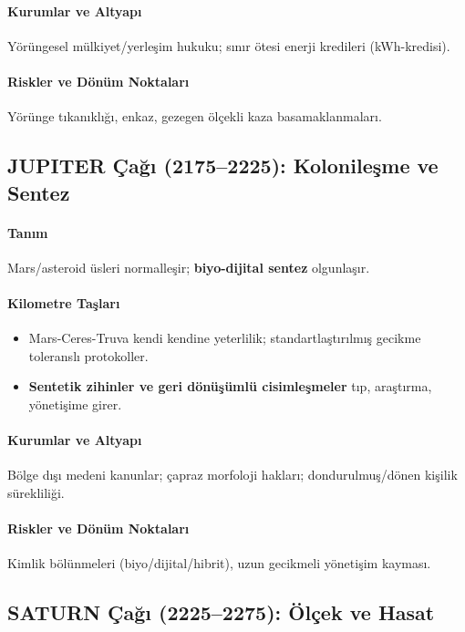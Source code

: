 \documentclass[11pt]{article}
\begin{document}
\begin{itemize}[noitemsep]
\begin{itemize}[noitemsep]
\begin{itemize}[noitemsep]
\begin{itemize}[noitemsep]
\begin{itemize}[noitemsep]
\begin{itemize}[noitemsep]
\begin{itemize}[noitemsep]
\begin{enumerate}[noitemsep]
\begin{itemize}[noitemsep]
\paragraph{Kurumlar ve Altyapı} Yörüngesel mülkiyet/yerleşim hukuku; sınır ötesi enerji kredileri (kWh-kredisi).

\paragraph{Riskler ve Dönüm Noktaları} Yörünge tıkanıklığı, enkaz, gezegen ölçekli kaza basamaklanmaları.

\subsection{JUPITER Çağı (2175–2225): Kolonileşme ve Sentez}
\paragraph{Tanım} Mars/asteroid üsleri normalleşir; \textbf{biyo-dijital sentez} olgunlaşır.

\paragraph{Kilometre Taşları}
\begin{itemize}[noitemsep]
  \item Mars-Ceres-Truva kendi kendine yeterlilik; standartlaştırılmış gecikme toleranslı protokoller.
  \item \textbf{Sentetik zihinler ve geri dönüşümlü cisimleşmeler} tıp, araştırma, yönetişime girer.
\end{itemize}

\paragraph{Kurumlar ve Altyapı} Bölge dışı medeni kanunlar; çapraz morfoloji hakları; dondurulmuş/dönen kişilik sürekliliği.

\paragraph{Riskler ve Dönüm Noktaları} Kimlik bölünmeleri (biyo/dijital/hibrit), uzun gecikmeli yönetişim kayması.

\subsection{SATURN Çağı (2225–2275): Ölçek ve Hasat}

\end{itemize}
\end{enumerate}
\end{itemize}
\end{itemize}
\end{itemize}
\end{itemize}
\end{itemize}
\end{itemize}
\end{itemize}
\end{document}
